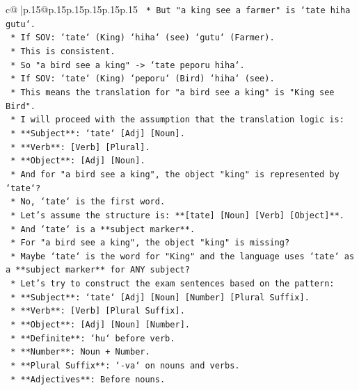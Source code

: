 \documentclass{article}
\begin{document}
{\begin{supertabular}{c@{$\;$}|p{.15\linewidth}@{}p{.15\linewidth}p{.15\linewidth}p{.15\linewidth}p{.15\linewidth}p{.15\linewidth}}
{{{\texttt{    *   But "a king see a farmer" is `tate hiha gutu`.} \\
\texttt{    *   If SOV: `tate` (King) `hiha` (see) `gutu` (Farmer).} \\
\texttt{    *   This is consistent.} \\
\texttt{    *   So "a bird see a king" {-}> `tate peporu hiha`.} \\
\texttt{    *   If SOV: `tate` (King) `peporu` (Bird) `hiha` (see).} \\
\texttt{    *   This means the translation for "a bird see a king" is "King see Bird".} \\
\texttt{    *   I will proceed with the assumption that the translation logic is:} \\
\texttt{    *   **Subject**: `tate` {[}Adj{]} {[}Noun{]}.} \\
\texttt{    *   **Verb**: {[}Verb{]} {[}Plural{]}.} \\
\texttt{    *   **Object**: {[}Adj{]} {[}Noun{]}.} \\
\texttt{    *   And for "a bird see a king", the object "king" is represented by `tate`?} \\
\texttt{    *   No, `tate` is the first word.} \\
\texttt{    *   Let's assume the structure is: **{[}tate{]} {[}Noun{]} {[}Verb{]} {[}Object{]}**.} \\
\texttt{    *   And `tate` is a **subject marker**.} \\
\texttt{    *   For "a bird see a king", the object "king" is missing?} \\
\texttt{    *   Maybe `tate` is the word for "King" and the language uses `tate` as a **subject marker** for ANY subject?} \\
\texttt{    *   Let's try to construct the exam sentences based on the pattern:} \\
\texttt{    *   **Subject**: `tate` {[}Adj{]} {[}Noun{]} {[}Number{]} {[}Plural Suffix{]}.} \\
\texttt{    *   **Verb**: {[}Verb{]} {[}Plural Suffix{]}.} \\
\texttt{    *   **Object**: {[}Adj{]} {[}Noun{]} {[}Number{]}.} \\
\texttt{    *   **Definite**: `hu` before verb.} \\
\texttt{    *   **Number**: Noun + Number.} \\
\texttt{    *   **Plural Suffix**: `{-}va` on nouns and verbs.} \\
\texttt{    *   **Adjectives**: Before nouns.} \\
}}}
\end{supertabular}}
\end{document}
